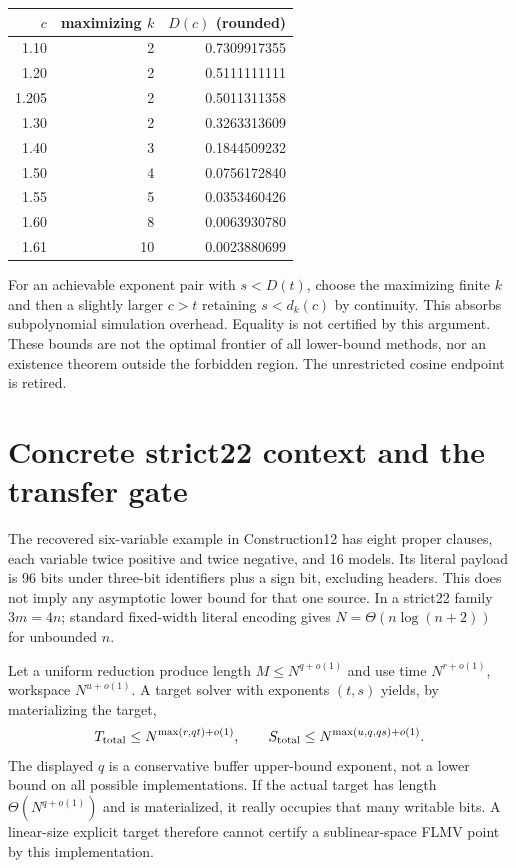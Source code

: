 \documentclass[11pt]{article}
\begin{document}
\begin{center}\begin{tabular}{rrr}\toprule
$c$&maximizing $k$&$D(c)$ (rounded)\\\midrule
1.10&2&0.7309917355\\
1.20&2&0.5111111111\\
1.205&2&0.5011311358\\
1.30&2&0.3263313609\\
1.40&3&0.1844509232\\
1.50&4&0.0756172840\\
1.55&5&0.0353460426\\
1.60&8&0.0063930780\\
1.61&10&0.0023880699\\\bottomrule
\end{tabular}\end{center}
For an achievable exponent pair with $s<D(t)$, choose the maximizing
finite $k$ and then a slightly larger $c>t$ retaining $s<d_k(c)$ by
continuity. This absorbs subpolynomial simulation overhead.
Equality is not certified by this argument. These bounds are not the
optimal frontier of all lower-bound methods, nor an existence theorem
outside the forbidden region. The unrestricted cosine endpoint is retired.

\section{Concrete strict22 context and the transfer gate}
The recovered six-variable example in Construction12 has eight proper
clauses, each variable twice positive and twice negative, and 16 models.
Its literal payload is 96 bits under three-bit identifiers plus a sign bit,
excluding headers. This does not imply any asymptotic lower bound for that
one source. In a strict22 family $3m=4n$; standard fixed-width literal
encoding gives $N=\Theta(n\log(n+2))$ for unbounded $n$.

Let a uniform reduction produce length $M\le N^{q+o(1)}$ and use
time $N^{r+o(1)}$, workspace $N^{u+o(1)}$.
A target solver with exponents $(t,s)$ yields, by materializing the target,
\[
 T_{\rm total}\le N^{\max(r,qt)+o(1)},\qquad
 S_{\rm total}\le N^{\max(u,q,qs)+o(1)}.
\]
The displayed $q$ is a conservative buffer upper-bound exponent, not a
lower bound on all possible implementations. If the actual target has
length $\Theta(N^{q+o(1)})$ and is materialized, it really occupies that
many writable bits. A linear-size explicit target therefore cannot
certify a sublinear-space FLMV point by this implementation.
\end{document}
